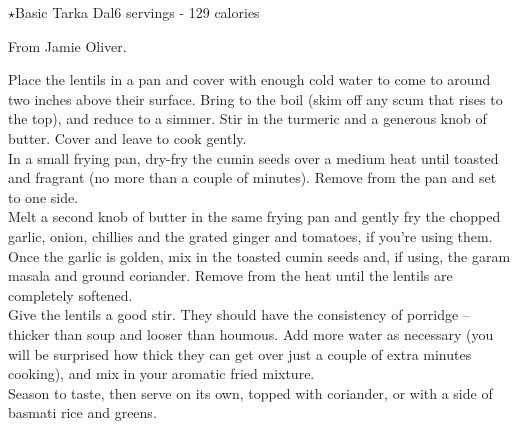 \begin{recipe}{$\star$Basic Tarka Dal}{6 servings - 129 calories}{}

\freeform From Jamie Oliver.


Place the lentils in a pan and cover with enough cold water to come to around two inches above their surface. Bring to the boil (skim off any scum that rises to the top), and reduce to a simmer. Stir in the turmeric and a generous knob of butter. Cover and leave to cook gently.\\

In a small frying pan, dry-fry the cumin seeds over a medium heat until toasted and fragrant (no more than a couple of minutes). Remove from the pan and set to one side.\\

Melt a second knob of butter in the same frying pan and gently fry the chopped garlic, onion, chillies and the grated ginger and tomatoes, if you’re using them. Once the garlic is golden, mix in the toasted cumin seeds and, if using, the garam masala and ground coriander. Remove from the heat until the lentils are completely softened.\\

Give the lentils a good stir. They should have the consistency of porridge – thicker than soup and looser than houmous. Add more water as necessary (you will be surprised how thick they can get over just a couple of extra minutes cooking), and mix in your aromatic fried mixture.\\

Season to taste, then serve on its own, topped with coriander, or with a side of basmati rice and greens.

\end{recipe}